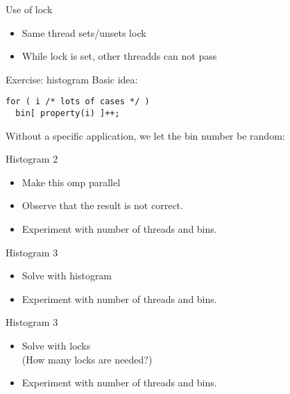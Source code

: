 \begin{numberedframe}{Use of lock}
  \begin{itemize}
  \item Same thread sets/unsets lock
  \item While lock is set, other threadds can not pass
  \end{itemize}
\end{numberedframe}

\begin{numberedframe}{Exercise: histogram}
  Basic idea:
\begin{lstlisting}
for ( i /* lots of cases */ )
  bin[ property(i) ]++;
\end{lstlisting}
Without a specific application, we let the bin number
be random:
\end{numberedframe}

\begin{numberedframe}{Histogram 2}
  \begin{itemize}
  \item Make this omp parallel
  \item Observe that the result is not correct.
  \item   Experiment with number of threads and bins.
  \end{itemize}
\end{numberedframe}

\begin{numberedframe}{Histogram 3}
  \begin{itemize}
  \item Solve with histogram
  \item Experiment with number of threads and bins.
  \end{itemize}
\end{numberedframe}

\begin{numberedframe}{Histogram 3}
  \begin{itemize}
  \item Solve with locks\\
    (How many locks are needed?)
  \item Experiment with number of threads and bins.
  \end{itemize}
\end{numberedframe}

\endinput

\begin{numberedframe}{}
  \begin{itemize}
  \item 
  \end{itemize}
\end{numberedframe}

